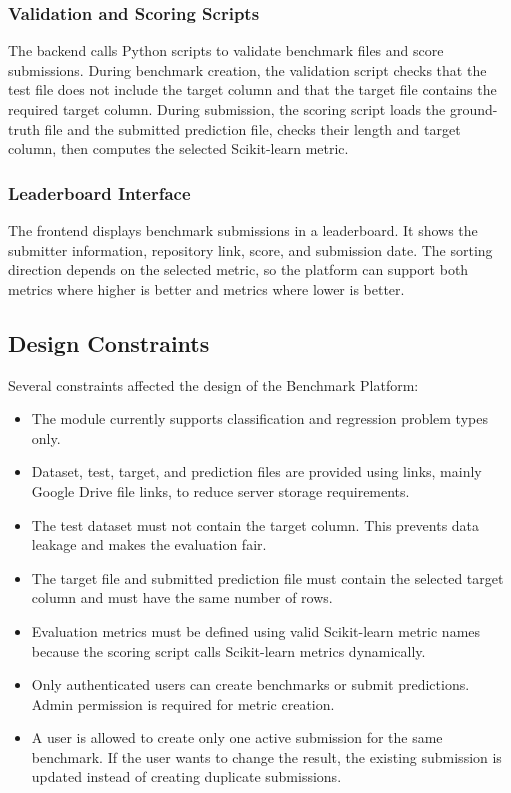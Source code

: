 \documentclass[12pt,a4paper]{report}
\begin{document}
\subsubsection{Validation and Scoring Scripts}
\noindent The backend calls Python scripts to validate benchmark files and score
submissions. During benchmark creation, the validation script checks that the
test file does not include the target column and that the target file contains
the required target column. During submission, the scoring script loads the
ground-truth file and the submitted prediction file, checks their length and
target column, then computes the selected Scikit-learn metric.

\subsubsection{Leaderboard Interface}
\noindent The frontend displays benchmark submissions in a leaderboard. It shows
the submitter information, repository link, score, and submission date. The
sorting direction depends on the selected metric, so the platform can support
both metrics where higher is better and metrics where lower is better.

\subsection{Design Constraints}
\noindent Several constraints affected the design of the Benchmark Platform:

\begin{itemize}
  \item The module currently supports classification and regression problem
  types only.

  \item Dataset, test, target, and prediction files are provided using links,
  mainly Google Drive file links, to reduce server storage requirements.

  \item The test dataset must not contain the target column. This prevents data
  leakage and makes the evaluation fair.

  \item The target file and submitted prediction file must contain the selected
  target column and must have the same number of rows.

  \item Evaluation metrics must be defined using valid Scikit-learn metric
  names because the scoring script calls Scikit-learn metrics dynamically.

  \item Only authenticated users can create benchmarks or submit predictions.
  Admin permission is required for metric creation.

  \item A user is allowed to create only one active submission for the same
  benchmark. If the user wants to change the result, the existing submission is
  updated instead of creating duplicate submissions.
\end{itemize}
\end{document}

